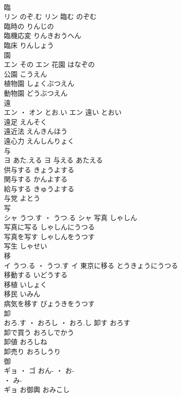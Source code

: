 \documentclass[8pt]{extreport}
\begin{document}
\begin{CJK}{UTF8}{min}
\\	臨	
\\	リン	のぞ.む	リン	臨む	のぞむ	
\\	臨時の	りんじの	
\\	臨機応変	りんきおうへん	
\\	臨床	りんしょう	
\\	園	
\\	エン	その	エン	花園	はなぞの	
\\	公園	こうえん	
\\	植物園	しょくぶつえん	
\\	動物園	どうぶつえん	
\\	遠	
\\	エン ・ オン	とお.い	エン	遠い	とおい	
\\	遠足	えんそく	
\\	遠近法	えんきんほう	
\\	遠心力	えんしんりょく	
\\	与	
\\	ヨ	あた.える	ヨ	与える	あたえる	
\\	供与する	きょうよする	
\\	関与する	かんよする	
\\	給与する	きゅうよする	
\\	与党	よとう	
\\	写	
\\	シャ	うつ.す ・ うつ.る	シャ	写真	しゃしん	
\\	写真に写る	しゃしんにうつる	
\\	写真を写す	しゃしんをうつす	
\\	写生	しゃせい	
\\	移	
\\	イ	うつ.る ・ うつ.す	イ	東京に移る	とうきょうにうつる	
\\	移動する	いどうする	
\\	移植	いしょく	
\\	移民	いみん	
\\	病気を移す	びょうきをうつす	
\\	卸	
\\	おろ.す ・ おろし ・ おろ.し		卸す	おろす	
\\	卸で買う	おろしでかう	
\\	卸値	おろしね	
\\	卸売り	おろしうり	
\\	御	
\\	ギョ ・ ゴ	おん- ・ お-
\\	・ み-
\\	ギョ													お御輿	おみこし	

\end{CJK}
\end{document}
